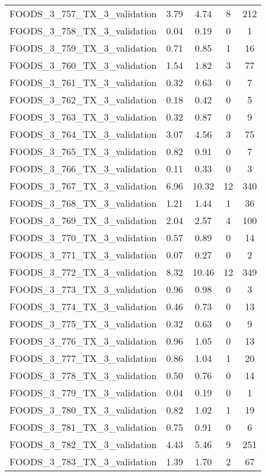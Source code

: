 \begin{table}
\begin{tabular}{|l|c|c|c|c|}
FOODS\_3\_757\_TX\_3\_validation & 3.79 & 4.74 & 8 & 212 \\
FOODS\_3\_758\_TX\_3\_validation & 0.04 & 0.19 & 0 & 1 \\
FOODS\_3\_759\_TX\_3\_validation & 0.71 & 0.85 & 1 & 16 \\
FOODS\_3\_760\_TX\_3\_validation & 1.54 & 1.82 & 3 & 77 \\
FOODS\_3\_761\_TX\_3\_validation & 0.32 & 0.63 & 0 & 7 \\
FOODS\_3\_762\_TX\_3\_validation & 0.18 & 0.42 & 0 & 5 \\
FOODS\_3\_763\_TX\_3\_validation & 0.32 & 0.87 & 0 & 9 \\
FOODS\_3\_764\_TX\_3\_validation & 3.07 & 4.56 & 3 & 75 \\
FOODS\_3\_765\_TX\_3\_validation & 0.82 & 0.91 & 0 & 7 \\
FOODS\_3\_766\_TX\_3\_validation & 0.11 & 0.33 & 0 & 3 \\
FOODS\_3\_767\_TX\_3\_validation & 6.96 & 10.32 & 12 & 340 \\
FOODS\_3\_768\_TX\_3\_validation & 1.21 & 1.44 & 1 & 36 \\
FOODS\_3\_769\_TX\_3\_validation & 2.04 & 2.57 & 4 & 100 \\
FOODS\_3\_770\_TX\_3\_validation & 0.57 & 0.89 & 0 & 14 \\
FOODS\_3\_771\_TX\_3\_validation & 0.07 & 0.27 & 0 & 2 \\
FOODS\_3\_772\_TX\_3\_validation & 8.32 & 10.46 & 12 & 349 \\
FOODS\_3\_773\_TX\_3\_validation & 0.96 & 0.98 & 0 & 3 \\
FOODS\_3\_774\_TX\_3\_validation & 0.46 & 0.73 & 0 & 13 \\
FOODS\_3\_775\_TX\_3\_validation & 0.32 & 0.63 & 0 & 9 \\
FOODS\_3\_776\_TX\_3\_validation & 0.96 & 1.05 & 0 & 13 \\
FOODS\_3\_777\_TX\_3\_validation & 0.86 & 1.04 & 1 & 20 \\
FOODS\_3\_778\_TX\_3\_validation & 0.50 & 0.76 & 0 & 14 \\
FOODS\_3\_779\_TX\_3\_validation & 0.04 & 0.19 & 0 & 1 \\
FOODS\_3\_780\_TX\_3\_validation & 0.82 & 1.02 & 1 & 19 \\
FOODS\_3\_781\_TX\_3\_validation & 0.75 & 0.91 & 0 & 6 \\
FOODS\_3\_782\_TX\_3\_validation & 4.43 & 5.46 & 9 & 251 \\
FOODS\_3\_783\_TX\_3\_validation & 1.39 & 1.70 & 2 & 67 \\

\end{tabular}
\end{table}
